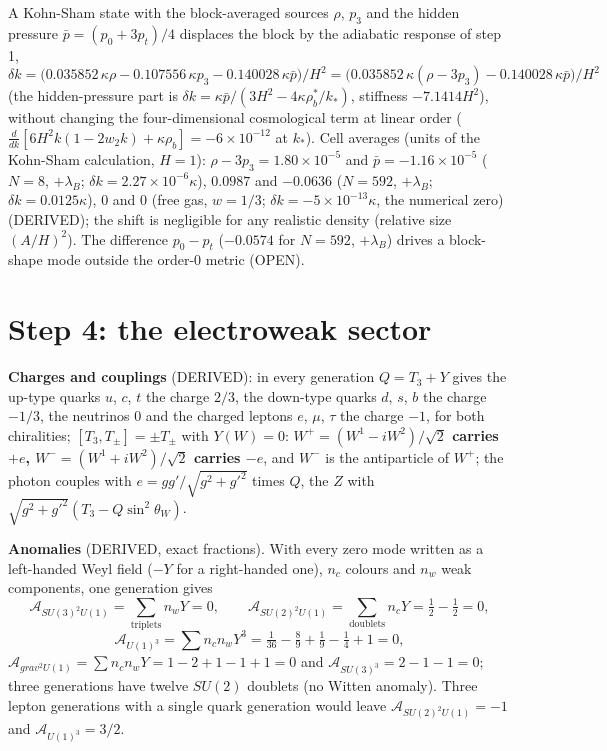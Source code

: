 \documentclass[
  10pt,
]{article}
\begin{document}
A Kohn-Sham state with the block-averaged sources \(\rho\), \(p_3\) and
the hidden pressure \(\bar p = (p_0 + 3p_t)/4\) displaces the block by
the adiabatic response of step 1,
\[ \delta k = \big(0.035852\,\kappa\rho - 0.107556\,\kappa p_3 - 0.140028\,\kappa\bar p\big)/H^2 = \big(0.035852\,\kappa(\rho - 3p_3) - 0.140028\,\kappa\bar p\big)/H^2 \]
(the hidden-pressure part is
\(\delta k = \kappa\bar p/(3H^2 - 4\kappa\rho_b^*/k_*)\), stiffness
\(-7.1414H^2\)), without changing the four-dimensional cosmological term
at linear order
(\(\frac{d}{dk}[6H^2k(1 - 2w_2k) + \kappa\rho_b] = -6\times10^{-12}\) at
\(k_*\)). Cell averages (units of the Kohn-Sham calculation, \(H = 1\)):
\(\rho - 3p_3 = 1.80\times10^{-5}\) and \(\bar p = -1.16\times10^{-5}\)
(\(N = 8\), \(+\lambda_B\); \(\delta k = 2.27\times10^{-6}\kappa\)),
\(0.0987\) and \(-0.0636\) (\(N = 592\), \(+\lambda_B\);
\(\delta k = 0.0125\kappa\)), \(0\) and \(0\) (free gas, \(w = 1/3\);
\(\delta k = -5\times10^{-13}\kappa\), the numerical zero) (DERIVED);
the shift is negligible for any realistic density (relative size
\((A/H)^2\)). The difference \(p_0 - p_t\) (\(-0.0574\) for \(N = 592\),
\(+\lambda_B\)) drives a block-shape mode outside the order-0 metric
(OPEN).

\hypertarget{step-4-the-electroweak-sector}{%
\section{Step 4: the electroweak
sector}\label{step-4-the-electroweak-sector}}

\textbf{Charges and couplings} (DERIVED): in every generation
\(Q = T_3 + Y\) gives the up-type quarks \(u\), \(c\), \(t\) the charge
\(2/3\), the down-type quarks \(d\), \(s\), \(b\) the charge \(-1/3\),
the neutrinos 0 and the charged leptons \(e\), \(\mu\), \(\tau\) the
charge \(-1\), for both chiralities; \([T_3, T_\pm] = \pm T_\pm\) with
\(Y(W) = 0\): \textbf{\(W^+ = (W^1 - iW^2)/\sqrt2\) carries \(+e\),
\(W^- = (W^1 + iW^2)/\sqrt2\) carries \(-e\)}, and \(W^-\) is the
antiparticle of \(W^+\); the photon couples with
\(e = gg'/\sqrt{g^2 + g'^2}\) times \(Q\), the \(Z\) with
\(\sqrt{g^2 + g'^2}(T_3 - Q\sin^2\theta_W)\).

\textbf{Anomalies} (DERIVED, exact fractions). With every zero mode
written as a left-handed Weyl field (\(-Y\) for a right-handed one),
\(n_c\) colours and \(n_w\) weak components, one generation gives
\[ \mathcal A_{SU(3)^2U(1)} = \sum_{\text{triplets}}n_wY = 0,\qquad \mathcal A_{SU(2)^2U(1)} = \sum_{\text{doublets}}n_cY = \tfrac12 - \tfrac12 = 0,\]
\[ \mathcal A_{U(1)^3} = \sum n_cn_wY^3 = \tfrac1{36} - \tfrac89 + \tfrac19 - \tfrac14 + 1 = 0,\]
\(\mathcal A_{grav^2U(1)} = \sum n_cn_wY = 1 - 2 + 1 - 1 + 1 = 0\) and
\(\mathcal A_{SU(3)^3} = 2 - 1 - 1 = 0\); three generations have twelve
\(SU(2)\) doublets (no Witten anomaly). Three lepton generations with a
single quark generation would leave \(\mathcal A_{SU(2)^2U(1)} = -1\)
and \(\mathcal A_{U(1)^3} = 3/2\).
\end{document}
